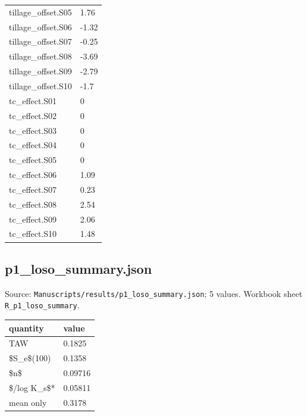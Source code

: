 {\begin{longtable}{p{}p{}}
{}tillage\_offset.S05 & 1.76\\
{}tillage\_offset.S06 & -1.32\\
{}tillage\_offset.S07 & -0.25\\
{}tillage\_offset.S08 & -3.69\\
{}tillage\_offset.S09 & -2.79\\
{}tillage\_offset.S10 & -1.7\\
{}tc\_effect.S01 & 0\\
{}tc\_effect.S02 & 0\\
{}tc\_effect.S03 & 0\\
{}tc\_effect.S04 & 0\\
{}tc\_effect.S05 & 0\\
{}tc\_effect.S06 & 1.09\\
{}tc\_effect.S07 & 0.23\\
{}tc\_effect.S08 & 2.54\\
{}tc\_effect.S09 & 2.06\\
{}tc\_effect.S10 & 1.48\\
\bottomrule\end{longtable}}

\subsection*{p1\_loso\_summary.json}
\noindent\small Source: \nolinkurl{Manuscripts/results/p1_loso_summary.json}; 5 values. Workbook sheet \texttt{R\_p1\_loso\_summary}.\par
{\scriptsize\begin{longtable}{p{}p{}}\toprule\textbf{quantity} & \textbf{value}\\\midrule\endhead
{}TAW & 0.1825\\
{}\$S\_e\$(100) & 0.1358\\
{}\$n\$ & 0.09716\\
{}\$/log K\_s\$* & 0.05811\\
{}mean only & 0.3178\\
\bottomrule\end{longtable}}

